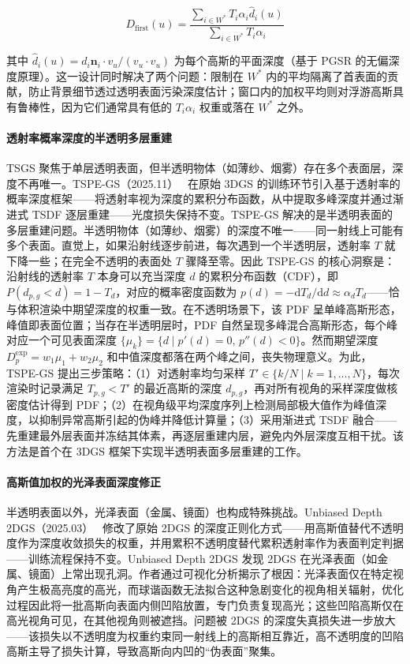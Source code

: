 \begin{equation}
D_{\text{first}}(u) = \frac{\sum_{i \in W^*} T_i \alpha_i \hat{d}_i(u)}{\sum_{i \in W^*} T_i \alpha_i}
\end{equation}

其中 $\hat{d}_i(u) = d_i \mathbf{n}_i \cdot v_u / (v_u \cdot v_u)$ 为每个高斯的平面深度（基于 PGSR 的无偏深度原理）。这一设计同时解决了两个问题：限制在 $W^*$ 内的平均隔离了首表面的贡献，防止背景细节透过透明表面污染深度估计；窗口内的加权平均则对浮游高斯具有鲁棒性，因为它们通常具有低的 $T_i \alpha_i$ 权重或落在 $W^*$ 之外。

\paragraph{透射率概率深度的半透明多层重建}

TSGS 聚焦于单层透明表面，但半透明物体（如薄纱、烟雾）存在多个表面层，深度不再唯一。TSPE-GS（2025.11）~\cite{2511_09944} 在原始 3DGS 的训练环节引入基于透射率的概率深度框架——将透射率视为深度的累积分布函数，从中提取多峰深度并通过渐进式 TSDF 逐层重建——光度损失保持不变。TSPE-GS 解决的是半透明表面的多层重建问题。半透明物体（如薄纱、烟雾）的深度不唯一——同一射线上可能有多个表面。直觉上，如果沿射线逐步前进，每次遇到一个半透明层，透射率 $T$ 就下降一些；在完全不透明的表面处 $T$ 骤降至零。因此 TSPE-GS 的核心洞察是：沿射线的透射率 $T$ 本身可以充当深度 $d$ 的累积分布函数（CDF），即 $P(d_{p,g} < d) = 1 - T_d$，对应的概率密度函数为 $p(d) = -\mathrm{d}T_d / \mathrm{d}d \approx \alpha_d T_d$——恰与体积渲染中期望深度的权重一致。在不透明场景下，该 PDF 呈单峰高斯形态，峰值即表面位置；当存在半透明层时，PDF 自然呈现多峰混合高斯形态，每个峰对应一个可见表面深度 $\{\mu_k\} = \{d \mid p'(d) = 0, \, p''(d) < 0\}$。然而期望深度 $D^{\mathrm{exp}}_p = w_1\mu_1 + w_2\mu_2$ 和中值深度都落在两个峰之间，丧失物理意义。为此，TSPE-GS 提出三步策略：（1）对透射率均匀采样 $T' \in \{k/N \mid k=1,\ldots,N\}$，每次渲染时记录满足 $T_{p,g} < T'$ 的最近高斯的深度 $d_{p,g}$，再对所有视角的采样深度做核密度估计得到 PDF；（2）在视角级平均深度序列上检测局部极大值作为峰值深度，以抑制异常高斯引起的伪峰并降低计算量；（3）采用渐进式 TSDF 融合——先重建最外层表面并冻结其体素，再逐层重建内层，避免内外层深度互相干扰。该方法是首个在 3DGS 框架下实现半透明表面多层重建的工作。

\paragraph{高斯值加权的光泽表面深度修正}

半透明表面以外，光泽表面（金属、镜面）也构成特殊挑战。Unbiased Depth 2DGS（2025.03）~\cite{2503_06587} 修改了原始 2DGS 的深度正则化方式——用高斯值替代不透明度作为深度收敛损失的权重，并用累积不透明度替代累积透射率作为表面判定判据——训练流程保持不变。Unbiased Depth 2DGS 发现 2DGS 在光泽表面（如金属、镜面）上常出现孔洞。作者通过可视化分析揭示了根因：光泽表面仅在特定视角产生极高亮度的高光，而球谐函数无法拟合这种急剧变化的视角相关辐射，优化过程因此将一批高斯向表面内侧凹陷放置，专门负责复现高光；这些凹陷高斯仅在高光视角可见，在其他视角则被遮挡。问题被 2DGS 的深度失真损失进一步放大——该损失以不透明度为权重约束同一射线上的高斯相互靠近，高不透明度的凹陷高斯主导了损失计算，导致高斯向内凹的“伪表面”聚集。

